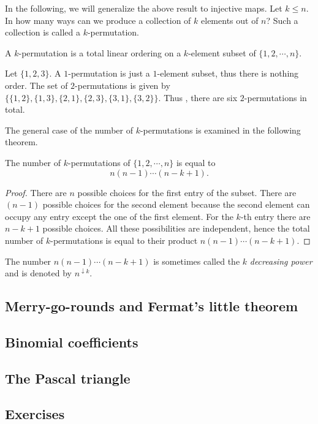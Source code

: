 In the following, we will generalize the above result to injective maps. Let $k \leq n$. In how many ways can we produce a collection 
of $k$ elements out of $n$? Such a collection is called a $k$-permutation.

\begin{defn}[$k$-permutation]
A $k$-permutation is a total linear ordering on a $k$-element subset of $\{1, 2, \cdots, n\}$.
\end{defn}

\begin{exmp}
Let $\{1,2 ,3\}$. A $1$-permutation is just a $1$-element subset, thus there is nothing order. The set of 
$2$-permutations is given by $\{\{1,2\}, \{1,3\}, \{2,1\}, \{2,3\}, \{3,1\}, \{3,2\}\}$.
Thus , there are six $2$-permutations in total.
\end{exmp}

\newpage

The general case of the number of $k$-permutations is examined in the following theorem.

\begin{theorem}
The number of $k$-permutations of $\{1,2, \cdots, n\}$ is equal to $$n(n-1)\cdots (n-k+1).$$
\end{theorem}

\begin{proof}
There are $n$ possible choices for the first entry of the subset. There are $(n-1)$ possible choices for the second element because the second element can occupy any entry except the one of the first element. 
For the $k$-th entry there are $n-k+1$ possible choices. All these possibilities are independent, hence
the total number of $k$-permutations is equal to their product $n(n-1)\cdots (n-k+1)$.
\end{proof}

The number $n(n-1)\cdots (n-k+1)$ is sometimes called the $k$ \textit{decreasing power} and is denoted by $n^{\downarrow k}$.

\subsection{Merry-go-rounds and Fermat's little theorem}

\subsection{Binomial coefficients}

\subsection{The Pascal triangle}

\subsection{Exercises}